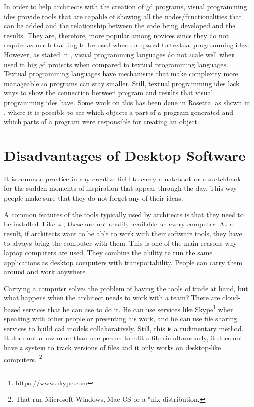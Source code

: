 In order to help architects with the creation of \gls{gd} programs, visual programming \glspl{ide} provide tools that are capable of showing all the nodes/functionalities that can be added and the relationship between the code being developed and the results.
They are, therefore, more popular among novices since they do not require as much training to be used when compared to textual programming \glspl{ide}.
However, as stated in \cite{leitao2012programming}, visual programming languages do not scale well when used in big \gls{gd} projects when compared to textual programming languages.
Textual programming languages have mechanisms that make complexity more manageable so programs can stay smaller.
Still, textual programming \glspl{ide} lack ways to show the connection between program and results that visual programming \glspl{ide} have.
Some work on this has been done in Rosetta, as shown in \cite{de2012modern}, where it is possible to see which objects a part of a program generated and which parts of a program were responsible for creating an object.


\section{Disadvantages of Desktop Software}
It is common practice in any creative field to carry a notebook or a sketchbook for the sudden moments of inspiration that appear through the day.
This way people make sure that they do not forget any of their ideas.

A common features of the tools typically used by architects is that they need to be installed.
Like so, these are not readily available on every computer.
As a result, if architects want to be able to work with their software tools, they have to always bring the computer with them.
This is one of the main reasons why laptop computers are used.
They combine the ability to run the same applications as desktop computers with transportability.
People can carry them around and work anywhere.

Carrying a computer solves the problem of having the tools of trade at hand, but what happens when the architect needs to work with a team?
There are cloud-based services that he can use to do it.
He can use services like Skype\footnote{https://www.skype.com} when speaking with other people or presenting his work, and he can use file sharing services to build \gls{cad} models collaboratively.
Still, this is a rudimentary method.
It does not allow more than one person to edit a file simultaneously, it does not have a system to track versions of files and it only works on desktop-like computers.%
\footnote{That run Microsoft Windows, Mac OS or a *nix distribution.}

